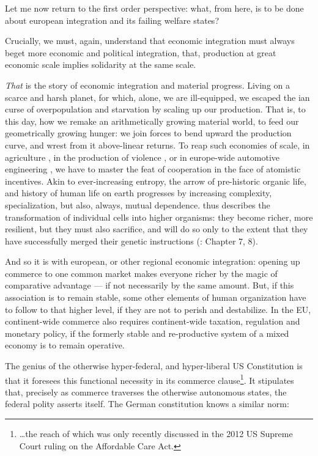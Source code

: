 \documentclass[11pt,a4paper,oneside,openright]{article}
\begin{document}
Let me now return to the first order perspective: what, from here, is to be done about european integration and its failing welfare states?

Crucially, we must, again, understand that economic integration must always beget more economic and political integration, that, production at great economic scale implies solidarity at the same scale.

\emph{That} is the story of economic integration and material progress. Living on a scarce and harsh planet, for which, alone, we are ill-equipped, we escaped the \citeauthor{Malthus1798}ian curse of overpopulation and starvation by scaling up our production. That is, to this day, how we remake an arithmetically growing material world, to feed our geometrically growing hunger: we join forces to bend upward the production curve, and wrest from it above-linear returns. To reap such economies of scale, in agriculture \citep{Diamond1997}, in the production of violence \citep{Tilly-1985-aa}, or in europe-wide automotive engineering \citep{Krugman-1980-aa}, we have to master the feat of cooperation in the face of atomistic incentives. Akin to ever-increasing entropy, the arrow of pre-historic organic life, and history of human life on earth progresses by increasing complexity, specialization, but also, always, mutual dependence. \citeauthor{Wright1994} thus describes the transformation of individual cells into higher organisms: they become richer, more resilient, but they must also sacrifice, and will do so only to the extent that they have successfully merged their genetic instructions (\citeyear{Wright1994}: Chapter 7, 8). %

And so it is with european, or other regional economic integration: opening up commerce to one common market makes everyone richer by the magic of comparative advantage --- if not necessarily by the same amount. But, if this association is to remain stable, some other elements of human organization have to follow to that higher level, if they are not to perish and destabilize. In the \gls{EU}, continent-wide commerce also requires continent-wide taxation, regulation and monetary policy, if the formerly stable and re-productive system of a mixed economy is to remain operative.

The genius of the otherwise hyper-federal, and hyper-liberal US Constitution is that it foresees this functional necessity in its commerce clause\footnote{
	\ldots the reach of which was only recently discussed in the 2012 US Supreme Court ruling on the Affordable Care Act.}.
It stipulates that, precisely as commerce traverses the otherwise autonomous states, the federal polity asserts itself. The German constitution knows a similar norm:
\end{document}
